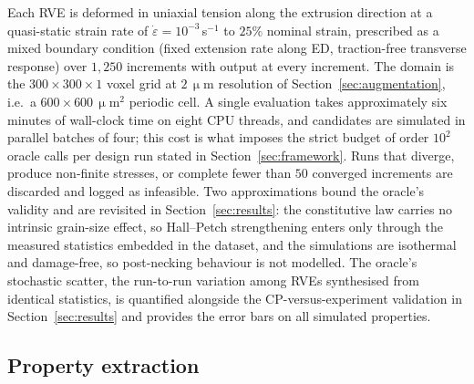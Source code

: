 \documentclass[preprint,12pt]{elsarticle}
\begin{document}
Each RVE is deformed in uniaxial tension along the extrusion direction at a quasi-static strain rate of $\dot\varepsilon = 10^{-3}$\,s$^{-1}$ to $25\%$ nominal strain, prescribed as a mixed boundary condition (fixed extension rate along ED, traction-free transverse response) over $1{,}250$ increments with output at every increment. The domain is the $300\times300\times1$ voxel grid at $2\,\upmu$m resolution of Section~\ref{sec:augmentation}, i.e.\ a $600\times600\,\upmu$m$^{2}$ periodic cell. A single evaluation takes approximately six minutes of wall-clock time on eight CPU threads, and candidates are simulated in parallel batches of four; this cost is what imposes the strict budget of order $10^{2}$ oracle calls per design run stated in Section~\ref{sec:framework}. Runs that diverge, produce non-finite stresses, or complete fewer than $50$ converged increments are discarded and logged as infeasible. Two approximations bound the oracle's validity and are revisited in Section~\ref{sec:results}: the constitutive law carries no intrinsic grain-size effect, so Hall--Petch strengthening enters only through the measured statistics embedded in the dataset, and the simulations are isothermal and damage-free, so post-necking behaviour is not modelled. The oracle's stochastic scatter, the run-to-run variation among RVEs synthesised from identical statistics, is quantified alongside the CP-versus-experiment validation in Section~\ref{sec:results} and provides the error bars on all simulated properties.

\subsection{Property extraction}
\label{sec:property-extraction}
\end{document}
